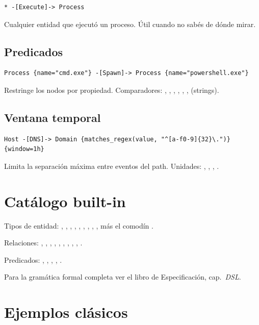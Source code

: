 \begin{lstlisting}[basicstyle=\ttfamily\small]
* -[Execute]-> Process
\end{lstlisting}

Cualquier entidad que ejecutó un proceso. Útil cuando no sabés de
dónde mirar.

\subsection{Predicados}

\begin{lstlisting}[basicstyle=\ttfamily\small]
Process {name="cmd.exe"} -[Spawn]-> Process {name="powershell.exe"}
\end{lstlisting}

Restringe los nodos por propiedad. Comparadores: \code{=},
\code{!=}, \code{>}, \code{<}, \code{>=}, \code{<=},
 (strings).

\subsection{Ventana temporal}

\begin{lstlisting}[basicstyle=\ttfamily\small]
Host -[DNS]-> Domain {matches_regex(value, "^[a-f0-9]{32}\.")}
{window=1h}
\end{lstlisting}

Limita la separación máxima entre eventos del path. Unidades:
, , , .

\section{Catálogo built-in}

Tipos de entidad: , , ,
, , , ,
, , más el comodín \code{*}.

Relaciones: , , ,
, , , ,
, , \code{*}.

Predicados: ,
, ,
, .

Para la gramática formal completa ver el libro de Especificación,
cap.\ \emph{DSL}.

\section{Ejemplos clásicos}

